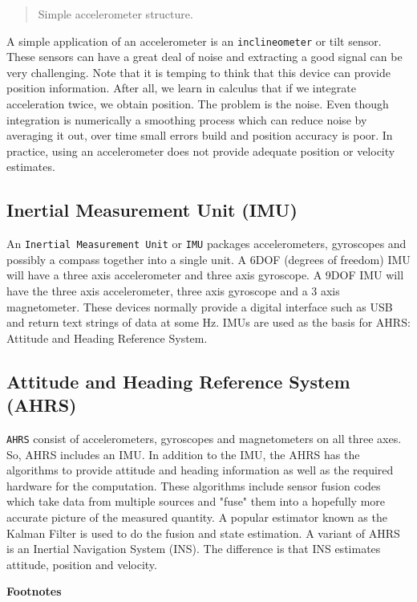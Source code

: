 \begin{quote}
Simple accelerometer structure.
\end{quote}

A simple application of an accelerometer is an \texttt{inclineometer} or
tilt sensor. These sensors can have a great deal of noise and extracting
a good signal can be very challenging. Note that it is temping to think
that this device can provide position information. After all, we learn
in calculus that if we integrate acceleration twice, we obtain position.
The problem is the noise. Even though integration is numerically a
smoothing process which can reduce noise by averaging it out, over time
small errors build and position accuracy is poor. In practice, using an
accelerometer does not provide adequate position or velocity estimates.

\hypertarget{inertial-measurement-unit-imu}{%
\subsection{Inertial Measurement Unit
(IMU)}\label{inertial-measurement-unit-imu}}

An \texttt{Inertial\ Measurement\ Unit} or \texttt{IMU} packages
accelerometers, gyroscopes and possibly a compass together into a single
unit. A 6DOF (degrees of freedom) IMU will have a three axis
accelerometer and three axis gyroscope. A 9DOF IMU will have the three
axis accelerometer, three axis gyroscope and a 3 axis magnetometer.
These devices normally provide a digital interface such as USB and
return text strings of data at some Hz. IMUs are used as the basis for
AHRS: Attitude and Heading Reference System.

\hypertarget{attitude-and-heading-reference-system-ahrs}{%
\subsection{Attitude and Heading Reference System
(AHRS)}\label{attitude-and-heading-reference-system-ahrs}}

\texttt{AHRS} consist of accelerometers, gyroscopes and magnetometers on
all three axes. So, AHRS includes an IMU. In addition to the IMU, the
AHRS has the algorithms to provide attitude and heading information as
well as the required hardware for the computation. These algorithms
include sensor fusion codes which take data from multiple sources and
"fuse" them into a hopefully more accurate picture of the measured
quantity. A popular estimator known as the Kalman Filter is used to do
the fusion and state estimation. A variant of AHRS is an Inertial
Navigation System (INS). The difference is that INS estimates attitude,
position and velocity.

\textbf{Footnotes}
